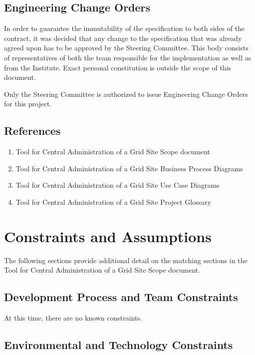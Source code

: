 \documentclass[12pt]{article}
\begin{document}
\subsection{Engineering Change Orders}
\label{steering-committee}

In order to guarantee the immutability of the specification to both sides of the
contract, it was decided that any change to the specification that was already
agreed upon has to be approved by the Steering Committee.  This body consists of
representatives of both the team responsible for the implementation as well as
from the Institute.  Exact personal constitution is outside the scope of this
document.

Only the Steering Committee is authorized to issue Engineering Change Orders for
this project.

\subsection{References}

\begin{enumerate}
	\item Tool for Central Administration of a Grid Site Scope document
	\item	Tool for Central Administration of a Grid Site Business Process Diagrams
	\item Tool for Central Administration of a Grid Site Use Case Diagrams
	\item Tool for Central Administration of a Grid Site Project Glossary
\end{enumerate}


\section{Constraints and Assumptions}
The following sections provide additional detail on the matching sections in the Tool for Central Administration of a Grid Site 
Scope document.

\subsection{Development Process and Team Constraints}
At this time, there are no known constraints.

\subsection{Environmental and Technology Constraints}
\end{document}
